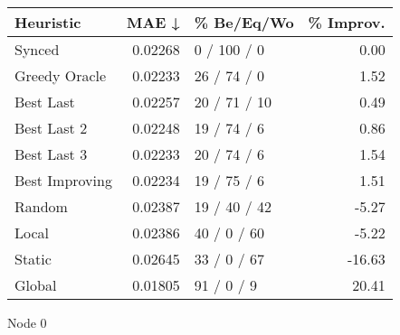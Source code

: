 \begin{tabular}{lrlr}
\toprule
\textbf{Heuristic} & \textbf{MAE ↓} & \textbf{\% Be/Eq/Wo} & \textbf{\% Improv.} \\
\midrule
            Synced &        0.02268 &          0 / 100 / 0 &                0.00 \\
     Greedy Oracle &        0.02233 &          26 / 74 / 0 &                1.52 \\
         Best Last &        0.02257 &         20 / 71 / 10 &                0.49 \\
       Best Last 2 &        0.02248 &          19 / 74 / 6 &                0.86 \\
       Best Last 3 &        0.02233 &          20 / 74 / 6 &                1.54 \\
    Best Improving &        0.02234 &          19 / 75 / 6 &                1.51 \\
            Random &        0.02387 &         19 / 40 / 42 &               -5.27 \\
             Local &        0.02386 &          40 / 0 / 60 &               -5.22 \\
            Static &        0.02645 &          33 / 0 / 67 &              -16.63 \\
            Global &        0.01805 &           91 / 0 / 9 &               20.41 \\
\bottomrule
\end{tabular}
\caption{Node 0}
\label{tab:iid_lr05_le1_bs4_0}
